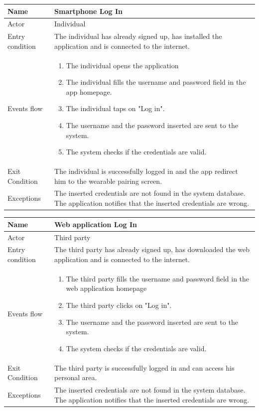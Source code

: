 \begin{table}[p]
\centering
\begin{tabular}{|l|p{11cm}|}
    \hline
    Name & Smartphone Log In
    \\ \hline
    Actor & Individual
    \\ \hline 
    Entry condition & The individual has already signed up, has installed the application and is connected to the internet.
    \\ \hline
    Events flow &
    \begin{enumerate}
    \item The individual opens the application
    \item The individual fills the username and password field in the app homepage.
    \item The individual taps on "Log in".
    \item The username and the password inserted are sent to the system.
    \item The system checks if the credentials are valid.
    \end{enumerate}
     \\ \hline
     Exit Condition & The individual is successfully logged in and the app redirect him to the wearable pairing screen.
     \\
    \hline
    Exceptions &
	The inserted credentials are not found in the system database.
   The application notifies that the inserted credentials are wrong.
      \\
    \hline
\end{tabular}
\end{table}

\begin{table}[p]
\centering
\begin{tabular}{|l|p{11cm}|}
    \hline
    Name & Web application Log In
    \\ \hline
    Actor & Third party
    \\ \hline 
    Entry condition & The third party has already signed up, has downloaded the web application and is connected to the internet.
    \\ \hline
    Events flow &
    \begin{enumerate}
    \item The third party fills the username and password field in the web application homepage
    \item The third party clicks on "Log in".
    \item The username and the password inserted are sent to the system.
    \item The system checks if the credentials are valid.
    \end{enumerate}
     \\ \hline
     Exit Condition & The third party is successfully logged in and can access his personal area.
     \\
    \hline
    Exceptions &
    The inserted credentials are not found in the system database.  
   The application notifies that the inserted credentials are wrong.
      \\
    \hline
\end{tabular}
\end{table}


